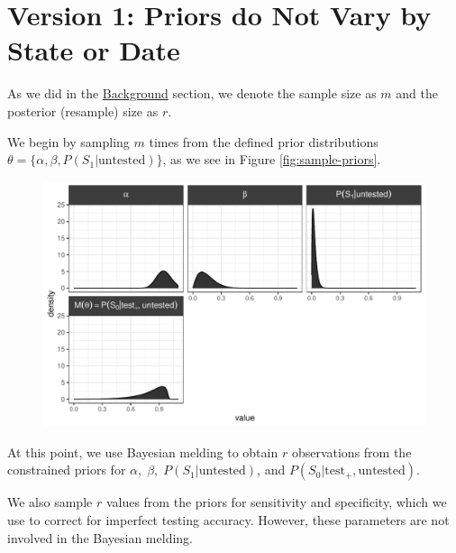\documentclass[12pt,twoside]{smiththesis}
\begin{document}
\hypertarget{version-1-priors-do-not-vary-by-state-or-date}{%
\section{Version 1: Priors do Not Vary by State or Date}\label{version-1-priors-do-not-vary-by-state-or-date}}

As we did in the \protect\hyperlink{sampling}{Background} section, we denote the sample size as \(m\) and the posterior (resample) size as \(r\).

We begin by sampling \(m\) times from the defined prior distributions \(\theta = \Big\{ \alpha, \beta, P(S_1| \text{untested})\Big\}\), as we see in Figure \ref{fig:sample-priors}.
\begin{figure}
\includegraphics[width=1\linewidth]{thesis_files/figure-latex/unnamed-chunk-65-1} \caption{\label{fig:sample-priors}}\label{fig:unnamed-chunk-65}
\end{figure}
At this point, we use Bayesian melding to obtain \(r\) observations from the constrained priors for \(\alpha, \; \beta, \;P(S_1|\text{untested})\), and \(P(S_0|\text{test}_+,\text{untested})\).

We also sample \(r\) values from the priors for sensitivity and specificity, which we use to correct for imperfect testing accuracy. However, these parameters are not involved in the Bayesian melding.
\end{document}
